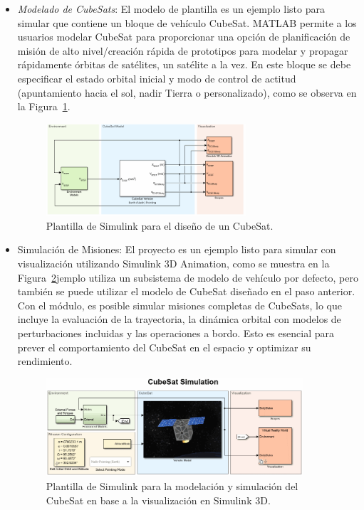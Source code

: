 \begin{itemize}
	\item \textit{Modelado de CubeSats}:  El modelo de plantilla es un ejemplo listo para simular que contiene un bloque de vehículo CubeSat. MATLAB permite a los usuarios modelar CubeSat para proporcionar una opción de planificación de misión de alto nivel/creación rápida de prototipos para modelar y propagar rápidamente órbitas de satélites, un satélite a la vez. En este bloque se debe especificar el estado orbital inicial y modo de control de actitud (apuntamiento hacia el sol, nadir Tierra o personalizado), como se observa en la Figura~\ref{fig:blockset_1}.
	
	\begin{figure}[H]
		\centering    
		\includegraphics[width=0.7\textwidth]{blockset_1.png}
		\caption{Plantilla de Simulink para el diseño de un CubeSat.}
		\label{fig:blockset_1}
	\end{figure}
	
	\item Simulación de Misiones: El proyecto es un ejemplo listo para simular con visualización utilizando Simulink 3D Animation, como se muestra en la Figura~\ref{fig:blockset_2}jemplo utiliza un subsistema de modelo de vehículo por defecto, pero también se puede utilizar el modelo de CubeSat diseñado en el paso anterior. Con el módulo, es posible simular misiones completas de CubeSats, lo que incluye la evaluación de la trayectoria, la dinámica orbital con modelos de perturbaciones incluidas y las operaciones a bordo. Esto es esencial para prever el comportamiento del CubeSat en el espacio y optimizar su rendimiento.
	
	\begin{figure}[H]
		\centering    
		\includegraphics[width=0.9\textwidth]{blockset_2.png}
		\caption{Plantilla de Simulink para la modelación y simulación del CubeSat en base a la visualización en Simulink 3D.}
		\label{fig:blockset_2}
	\end{figure}	
	

\end{itemize}
